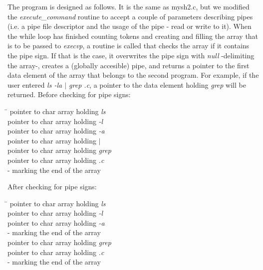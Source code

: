 \documentclass[a4paper,10pt]{article}
\begin{document}
The program is designed as follows. It is the same as mysh2.c, but we modified the \emph{execute\_command} routine to accept a couple of parameters describing pipes (i.e. a pipe file descriptor and the usage of the pipe - read or write to it). When the while loop has finished counting tokens and creating and filling the array that is to be passed to \emph{execvp}, a routine is called that checks the array if it contains the pipe sign. If that is the case, it overwrites the pipe sign with \emph{null} -delimiting the array-, creates a (globally accesible) pipe, and returns a pointer to the first data element of the array that belongs to the second program. For example, if the user entered \emph{ls -la $\mid$ grep .c}, a pointer to the data element holding \emph{grep} will be returned. Before checking for pipe signs:
\begin{tabbing}
\hspace{20pt}\=\kill
 \> [0] pointer to char array holding \emph{ls}\\ 
 \> [1] pointer to char array holding \emph{-l}\\
 \> [2] pointer to char array holding \emph{-a}\\
 \> [3] pointer to char array holding \emph{$\mid$}\\ 
 \> [4] pointer to char array holding \emph{grep}\\
 \> [5] pointer to char array holding \emph{.c}\\
  - marking the end of the array
\end{tabbing}
After checking for pipe signs:
\begin{tabbing}
\hspace{20pt}\=\kill
 \> [0] pointer to char array holding \emph{ls}\\ 
 \> [1] pointer to char array holding \emph{-l}\\
 \> [2] pointer to char array holding \emph{-a}\\
  - marking the end of the array\\ 
 \> [4] pointer to char array holding \emph{grep}\\
 \> [5] pointer to char array holding \emph{.c}\\
  - marking the end of the array
\end{tabbing}
\end{document}
